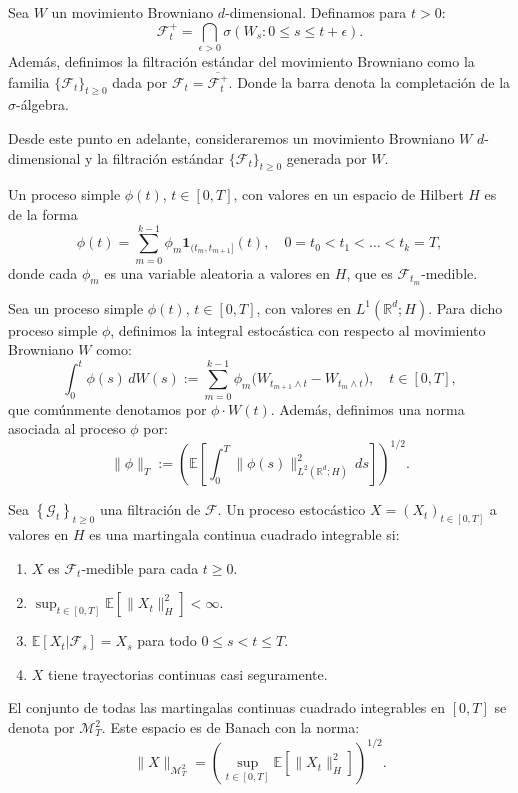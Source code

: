 \begin{defn}
  Sea $W$ un movimiento Browniano $d$-dimensional. Definamos para $t >0$:
  \[
    \mathcal{F}^+_t = \bigcap_{\epsilon > 0}\sigma\left( W_s : 0 \leq s \leq t + \epsilon \right).
  \]
  Además, definimos la filtración estándar del movimiento Browniano como la familia $\{\mathcal{F}_t\}_{t \geq 0}$ dada por $\mathcal{F}_t = \overline{\mathcal{F}^+_t}$. Donde la barra denota la completación de la $\sigma$-álgebra.
\end{defn}

Desde este punto en adelante, consideraremos un movimiento Browniano $W$ $d$-dimensional y la filtración estándar $\{\mathcal{F}_t\}_{t \geq 0}$ generada por $W$.

\begin{defn}
  Un proceso simple $\phi(t)$, $t \in [0,T]$, con valores en un espacio de Hilbert $H$ es de la forma
  \[
    \phi(t) = \sum_{m=0}^{k-1} \phi_m \mathbf{1}_{(t_m, t_{m+1}]}(t), \quad 0 = t_0 < t_1 < \ldots < t_k = T,
  \]
  donde cada $\phi_m$ es una variable aleatoria a valores en $H$, que es $\mathcal{F}_{t_m}$-medible.
\end{defn}

\begin{defn}
  Sea un proceso simple $\phi(t)$, $t \in [0,T]$, con valores en $L^1(\mathbb{R}^d; H)$. Para dicho proceso simple $\phi$, definimos la integral estocástica con respecto al movimiento Browniano $W$ como:
  \[
    \int_{0}^{t} \phi(s)\, dW(s) := \sum_{m=0}^{k-1} \phi_m\bigl(W_{t_{m+1} \wedge t} - W_{t_m \wedge t}\bigr), \quad t \in [0,T],
  \]
  que comúnmente denotamos por $\phi \cdot W(t)$. Además, definimos una norma asociada al proceso $\phi$ por:
  \[
    \|\phi\|_T := \left(\mathbb{E}\left[\int_0^T \|\phi(s)\|_{L^2(\mathbb{R}^{d}; H)}^2\, ds\right]\right)^{1/2}.
  \]
\end{defn}

\begin{defn}
  Sea $\left\{\mathcal{G}_t\right\}_{t \geq 0}$ una filtración de $\mathcal{F}$. Un proceso estocástico $X = (X_t)_{t \in [0, T]}$ a valores en $H$ es una martingala continua cuadrado integrable si:
  \begin{enumerate}
    \item $X$ es $\mathcal{F}_t$-medible para cada $t \geq 0$.
    \item $\sup_{t \in [0, T]}\mathbb{E}[\|X_t\|_H^2] < \infty$.
    \item $\mathbb{E}[X_t | \mathcal{F}_s] = X_s$ para todo $0 \leq s < t \leq T$.
    \item $X$ tiene trayectorias continuas casi seguramente.
  \end{enumerate}
  El conjunto de todas las martingalas continuas cuadrado integrables en $[0, T]$ se denota por $\mathcal{M}_T^2$. Este espacio es de Banach con la norma:
  \[
    \|X\|_{\mathcal{M}_T^2} = \left(\sup_{t \in [0, T]}\mathbb{E}\left[\|X_t\|_H^2\right]\right)^{1/2}.
  \]
\end{defn}

